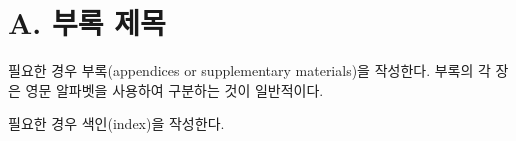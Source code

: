 \documentclass[11pt]{report}
\numberwithin{figure}{chapter}
\begin{document}

\normalsize
{} 
\section*{A. 부록 제목} %
필요한 경우 부록(appendices or supplementary materials)을 작성한다.
부록의 각 장은 영문 알파벳을 사용하여 구분하는 것이 일반적이다.


\renewcommand{\indexname}{색인}
\printindex
\bigskip

필요한 경우 색인(index)을 작성한다.
\end{document}
